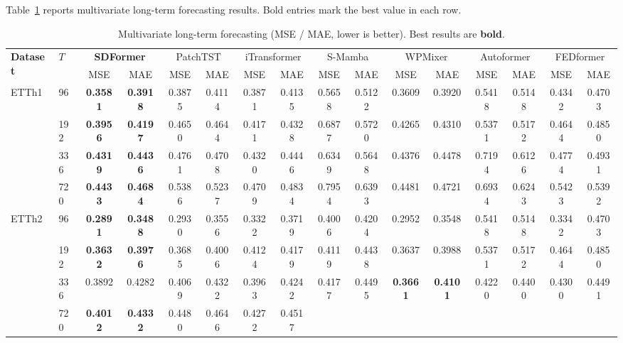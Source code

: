 \documentclass[journal]{IEEEtran}
\begin{document}
Table~\ref{tab:main} reports multivariate long-term forecasting results.
Bold entries mark the best value in each row.

\begin{table}[!t]
\caption{Multivariate long-term forecasting (MSE / MAE, lower is better).
  Best results are \textbf{bold}.}
\label{tab:main}
\centering
\renewcommand{\arraystretch}{1.15}
\setlength{\tabcolsep}{4pt}
\begin{tabular}{llcccccccccccccc}
\toprule
\multirow{2}{*}{\textbf{Dataset}} & \multirow{2}{*}{$T$}
  & \multicolumn{2}{c}{\textbf{SDFormer}}
  & \multicolumn{2}{c}{PatchTST}
  & \multicolumn{2}{c}{iTransformer}
  & \multicolumn{2}{c}{S-Mamba}
  & \multicolumn{2}{c}{WPMixer}
  & \multicolumn{2}{c}{Autoformer}
  & \multicolumn{2}{c}{FEDformer} \\
\cmidrule(lr){3-4}\cmidrule(lr){5-6}\cmidrule(lr){7-8}
\cmidrule(lr){9-10}\cmidrule(lr){11-12}\cmidrule(lr){13-14}\cmidrule(lr){15-16}
 & & MSE & MAE & MSE & MAE & MSE & MAE
   & MSE & MAE & MSE & MAE & MSE & MAE & MSE & MAE \\
\midrule
\multirow{4}{*}{ETTh1}
 & 96  & \textbf{0.3581} & \textbf{0.3918} & 0.3875 & 0.4114 & 0.3871 & 0.4135
        & 0.5658 & 0.5122 & 0.3609 & 0.3920 & 0.5418 & 0.5148 & 0.4342 & 0.4703 \\
 & 192 & \textbf{0.3956} & \textbf{0.4197} & 0.4650 & 0.4644 & 0.4171 & 0.4328
        & 0.6877 & 0.5720 & 0.4265 & 0.4310 & 0.5371 & 0.5172 & 0.4644 & 0.4850 \\
 & 336 & \textbf{0.4319} & \textbf{0.4436} & 0.4761 & 0.4708 & 0.4320 & 0.4446
        & 0.6349 & 0.5648 & 0.4376 & 0.4478 & 0.7194 & 0.6126 & 0.4774 & 0.4931 \\
 & 720 & \textbf{0.4433} & \textbf{0.4684} & 0.5386 & 0.5237 & 0.4709 & 0.4834
        & 0.7954 & 0.6393 & 0.4481 & 0.4721 & 0.6934 & 0.6243 & 0.5423 & 0.5392 \\
\midrule
\multirow{4}{*}{ETTh2}
 & 96  & \textbf{0.2891} & \textbf{0.3488} & 0.2930 & 0.3556 & 0.3322 & 0.3719
        & 0.4006 & 0.4204 & 0.2952 & 0.3548 & 0.5418 & 0.5148 & 0.3342 & 0.4703 \\
 & 192 & \textbf{0.3632} & \textbf{0.3976} & 0.3685 & 0.4006 & 0.4124 & 0.4179
        & 0.4119 & 0.4438 & 0.3637 & 0.3988 & 0.5371 & 0.5172 & 0.4644 & 0.4850 \\
 & 336 & 0.3892 & 0.4282 & 0.4069 & 0.4322 & 0.3963 & 0.4242
        & 0.4177 & 0.4495 & \textbf{0.3661} & \textbf{0.4101} & 0.4220 & 0.4400 & 0.4300 & 0.4491 \\
 & 720 & \textbf{0.4012} & \textbf{0.4332} & 0.4480 & 0.4646 & 0.4272 & 0.4517

\end{tabular}
\end{table}
\end{document}

